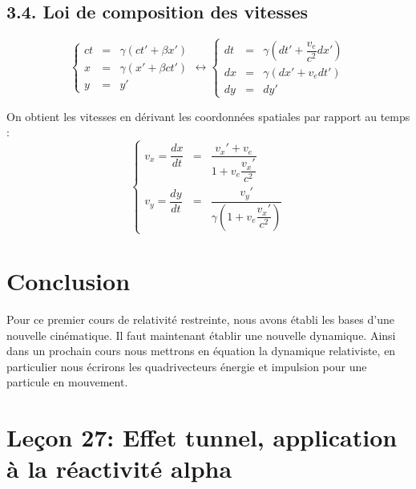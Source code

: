 \documentclass[french, a4paper, 10pt, twocolumn, landscape]{article}
\begin{document}
\subsection*{3.4. Loi de composition des vitesses}

\begin{equation}
	\left\{\begin{array}{rcl}
		ct &=& \gamma\left(ct'+\beta x'\right)\\
		x &=& \gamma\left(x'+\beta ct'\right)\\
		y &=& y'
	\end{array}\right.\leftrightarrow \left\{\begin{array}{rcl}
		dt &=& \gamma\left(dt'+\dfrac{v_e}{c^2} dx'\right)\\
		dx &=& \gamma\left(dx'+v_e dt'\right)\\
		dy &=& dy'
	\end{array}\right. \nonumber
\end{equation}

On obtient les vitesses en dérivant les coordonnées spatiales par rapport au temps : 
\begin{equation}
	\left\{\begin{array}{rcl}
		v_x = \dfrac{dx}{dt} &=& \dfrac{v_x'+v_e}{1+v_e\dfrac{v_x'}{c^2}}\\
		v_y = \dfrac{dy}{dt} &=& \dfrac{v_y'}{\gamma(1+v_e\dfrac{v_x'}{c^2})}
	\end{array}\right.
\end{equation}

\section*{Conclusion}

Pour ce premier cours de relativité restreinte, nous avons établi les bases d'une nouvelle cinématique. Il faut maintenant établir une nouvelle dynamique. Ainsi dans un prochain cours nous mettrons en équation la dynamique relativiste, en particulier nous écrirons les quadrivecteurs énergie et impulsion pour une particule en mouvement.

\clearpage

\section*{Leçon 27: Effet tunnel, application à la réactivité alpha}

\hrulefill\\
\end{document}
